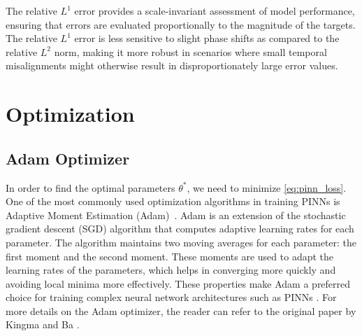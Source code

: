 The relative \( L^1 \) error provides a scale-invariant assessment of model performance, ensuring that errors are evaluated proportionally to the magnitude of the targets. The relative \( L^1 \) error is less sensitive to slight phase shifts as compared to the relative \( L^2 \) norm, making it more robust in scenarios where small temporal misalignments might otherwise result in disproportionately large error values.
\newpage
\section{Optimization}



\subsection{Adam Optimizer}
In order to find the optimal parameters $\theta^*$, we need to minimize \eqref{eq:pinn_loss}. One of the most commonly used optimization algorithms in training PINNs is Adaptive Moment Estimation (Adam)~\cite{adam}. Adam is an extension of the stochastic gradient descent (SGD) algorithm that computes adaptive learning rates for each parameter. The algorithm maintains two moving averages for each parameter: the first moment and the second moment. These moments are used to adapt the learning rates of the parameters, which helps in converging more quickly and avoiding local minima more effectively. These properties make Adam a preferred choice for training complex neural network architectures such as PINNs \cite{experts}. For more details on the Adam optimizer, the reader can refer to the original paper by Kingma and Ba \cite{adam}.






